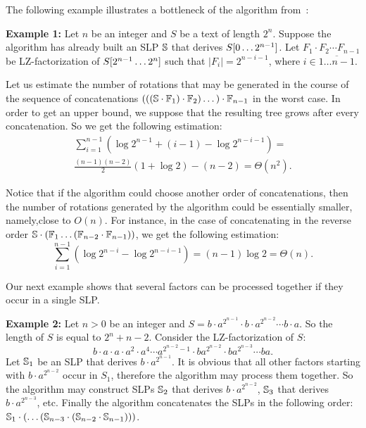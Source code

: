 ﻿\documentclass[10pt, conference, compsocconf]{IEEEtran}
\begin{document}
The following example illustrates a bottleneck of the algorithm
from~\cite{SLPConstruction}:

\noindent \textbf{Example 1:} Let $n$ be an integer and $S$ be a text of length
$2^n$. Suppose the algorithm has already built an SLP $\mathbb{S}$ that derives
$S[0\dots2^{n-1}]$. Let $F_1 \cdot F_2 \cdots F_{n-1}$ be LZ-factorization
of $S[2^{n-1}\dots2^n]$ such that $|F_i| = 2^{n-i-1}$, where $i \in
\overline{1\dots n-1}$.

Let us estimate the number of rotations that may be generated in the course of
the sequence of concatenations $(((\mathbb{S} \cdot \mathbb{F}_1)\cdot
\mathbb{F}_2)\dots) \cdot \mathbb{F}_{n-1}$ in the worst case. In order to get an
upper bound, we suppose that the resulting tree grows after every
concatenation. So we get the following estimation: \begin{multline*}
\sum_{i=1}^{n-1} (\log{2^{n-1}} + (i-1) - \log{2^{n-i-1}}) = \\
\frac{(n-1)(n-2)}{2}(1 + \log{2}) - (n-2) = \Theta(n^2).
\end{multline*}

Notice that if the algorithm could choose another order of concatenations, then
the number of rotations generated by the algorithm could be essentially
smaller, namely,close to $O(n)$. For instance, in the case of concatenating in
the reverse order $\mathbb{S} \cdot (\mathbb{F}_1 \dots (\mathbb{F}_{n-2} \cdot
\mathbb{F}_{n-1}))$, we get the following estimation:
$$\sum_{i=1}^{n-1} (\log{2^{n-i}} - \log{2^{n-i-1}}) = (n-1)\log{2} =
\Theta(n).$$

Our next example shows that several factors can be processed together if they
occur in a single SLP.

\noindent \textbf{Example 2:} Let $n > 0$ be an integer and $S = b\cdot
a^{2^{n-1}}\cdot b \cdot a^{2^{n-2}} \cdots b \cdot a$. So the length of $S$ is
equal to $2^n + n - 2$. Consider the LZ-factorization of $S$: $$ b \cdot a
\cdot a \cdot a^2 \cdot a^4 \cdots a^{2^{n-2} - 1} \cdot ba^{2^{n-2}} \cdot
ba^{2^{n-3}} \cdots ba.$$ Let $\mathbb{S}_1$ be an SLP that derives $b \cdot
a^{2^{n-1}}$. It is obvious that all other factors starting with $b \cdot
a^{2^{n-2}}$ occur in $S_1$, therefore the algorithm may process them together.
So the algorithm may construct SLPs $\mathbb{S}_2$ that derives $b \cdot
a^{2^{n-2}}$, $\mathbb{S}_3$ that derives $b \cdot a^{2^{n-3}}$, etc. Finally the
algorithm concatenates the SLPs in the following order:
$\mathbb{S}_1\cdot(\dots(\mathbb{S}_{n-3}\cdot(\mathbb{S}_{n-2} \cdot \mathbb{S}_{n-1})))$.
\end{document}
